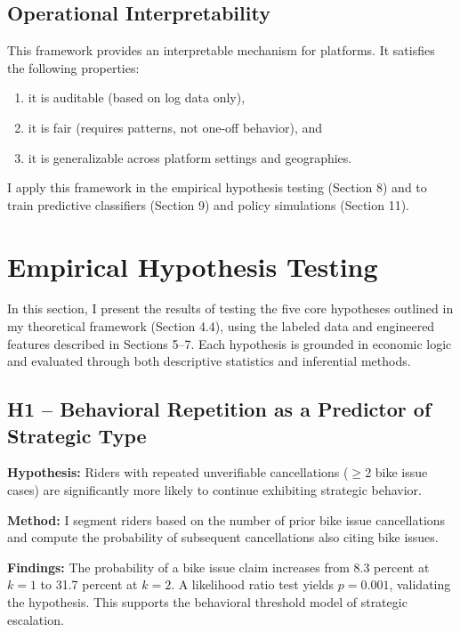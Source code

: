 \documentclass[12pt,letterpaper]{article}
\begin{document}
\subsection{Operational Interpretability}

This framework provides an interpretable mechanism for platforms. It satisfies the following properties:

\begin{enumerate}
    \item it is auditable (based on log data only),
    \item it is fair (requires patterns, not one-off behavior), and
    \item it is generalizable across platform settings and geographies.
\end{enumerate}

I apply this framework in the empirical hypothesis testing (Section 8) and to train predictive classifiers (Section 9) and policy simulations (Section 11).

\section{Empirical Hypothesis Testing}

In this section, I present the results of testing the five core hypotheses outlined in my theoretical framework (Section 4.4), using the labeled data and engineered features described in Sections 5--7. Each hypothesis is grounded in economic logic and evaluated through both descriptive statistics and inferential methods.

\subsection{H1 -- Behavioral Repetition as a Predictor of Strategic Type}

\textbf{Hypothesis:} Riders with repeated unverifiable cancellations ($\geq$2 bike issue cases) are significantly more likely to continue exhibiting strategic behavior.

\textbf{Method:} I segment riders based on the number of prior bike issue cancellations and compute the probability of subsequent cancellations also citing bike issues.

\textbf{Findings:} The probability of a bike issue claim increases from 8.3 percent at $k=1$ to 31.7 percent at $k=2$.  
A likelihood ratio test yields $p = 0.001$, validating the hypothesis. This supports the behavioral threshold model of strategic escalation.
\end{document}

